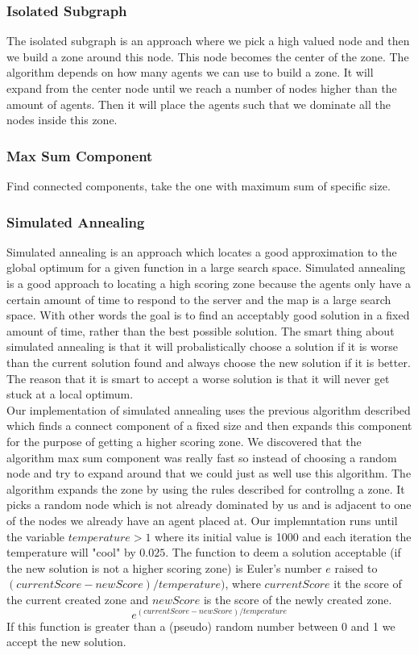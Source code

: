 \documentclass[11pt]{article}
\begin{document}
\subsubsection{Isolated Subgraph}
The isolated subgraph is an approach where we pick a high valued node and then we build a zone around this node. This node becomes the center of the zone. The algorithm depends on how many agents we can use to build a zone. It will expand from the center node until we reach a number of nodes higher than the amount of agents. Then it will place the agents such that we dominate all the nodes inside this zone.

\subsubsection{Max Sum Component}
Find connected components, take the one with maximum sum of specific size.

\subsubsection{Simulated Annealing}
Simulated annealing is an approach which locates a good approximation to the global optimum for a given function in a large search space. Simulated annealing is a good approach to locating a high scoring zone because the agents only have a certain amount of time to respond to the server and the map is a large search space. With other words the goal is to find an acceptably good solution in a fixed amount of time, rather than the best possible solution. The smart thing about simulated annealing is that it will probalistically choose a solution if it is worse than the current solution found and always choose the new solution if it is better. The reason that it is smart to accept a worse solution is that it will never get stuck at a local optimum.\\
Our implementation of simulated annealing uses the previous algorithm described which finds a connect component of a fixed size and then expands this component for the purpose of getting  a higher scoring zone. We discovered that the algorithm max sum component was really fast so instead of choosing a random node and try to expand around that we could just as well use this algorithm. The algorithm expands the zone by using the rules described for controllng a zone. It picks a random node which is not already dominated by us and is adjacent to one of the nodes we already have an agent placed at. Our implemntation runs until the variable $temperature > 1$ where its initial value is 1000 and each iteration the temperature will "cool" by $0.025$. The function to deem a solution acceptable (if the new solution is not a higher scoring zone) is Euler's number $e$ raised to $(currentScore - newScore) / temperature)$, where $currentScore$ it the score of the current created zone and $newScore$ is the score of the newly created zone.
$$e^{(currentScore - newScore) / temperature}$$
If this function is greater than a (pseudo) random number between 0 and 1 we accept the new solution.
\end{document}
